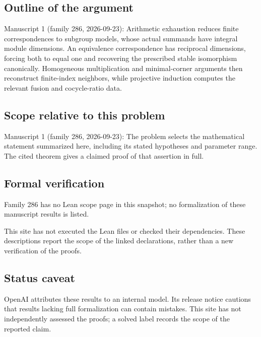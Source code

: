 \documentclass[11pt]{article}
\begin{document}
\subsection{Outline of the argument}
Manuscript 1 (family 286, 2026-09-23): Arithmetic exhaustion reduces finite correspondences to subgroup models, whose actual summands have integral module dimensions. An equivalence correspondence has reciprocal dimensions, forcing both to equal one and recovering the prescribed stable isomorphism canonically. Homogeneous multiplication and minimal-corner arguments then reconstruct finite-index neighbors, while projective induction computes the relevant fusion and cocycle-ratio data.

\subsection{Scope relative to this problem}
Manuscript 1 (family 286, 2026-09-23): The problem selects the mathematical statement summarized here, including its stated hypotheses and parameter range. The cited theorem gives a claimed proof of that assertion in full.

\subsection{Formal verification}
Family 286 has no Lean scope page in this snapshot; no formalization of these manuscript results is listed.

This site has not executed the Lean files or checked their dependencies. These descriptions report the scope of the linked declarations, rather than a new verification of the proofs.

\subsection{Status caveat}
OpenAI attributes these results to an internal model. Its release notice cautions that results lacking full formalization can contain mistakes. This site has not independently assessed the proofs; a solved label records the scope of the reported claim.
\end{document}
